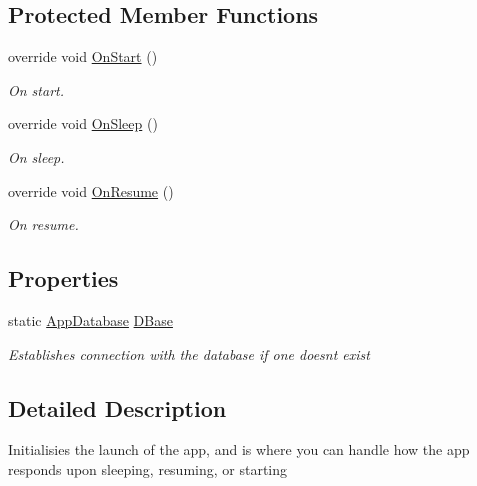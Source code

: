 \subsection*{Protected Member Functions}
\begin{DoxyCompactItemize}
\item 
override void \hyperlink{class_intention_journal_1_1_app_a773d1220e09f08c939dd778f5b72cb59}{On\+Start} ()
\begin{DoxyCompactList}\small\item\em On start. \end{DoxyCompactList}\item 
override void \hyperlink{class_intention_journal_1_1_app_a5c10eb75d1cf51c97a4063532be3db87}{On\+Sleep} ()
\begin{DoxyCompactList}\small\item\em On sleep. \end{DoxyCompactList}\item 
override void \hyperlink{class_intention_journal_1_1_app_a70f9ebff1405856baeb487da0d1de9ea}{On\+Resume} ()
\begin{DoxyCompactList}\small\item\em On resume. \end{DoxyCompactList}\end{DoxyCompactItemize}
\subsection*{Properties}
\begin{DoxyCompactItemize}
\item 
static \hyperlink{class_intention_journal_1_1_app_database}{App\+Database} \hyperlink{class_intention_journal_1_1_app_aea811782113fffd3d180aa9f62ab1acc}{D\+Base}
\begin{DoxyCompactList}\small\item\em Establishes connection with the database if one doesn\textquotesingle{}t exist \end{DoxyCompactList}\end{DoxyCompactItemize}


\subsection{Detailed Description}
Initialisies the launch of the app, and is where you can handle how the app responds upon sleeping, resuming, or starting 



